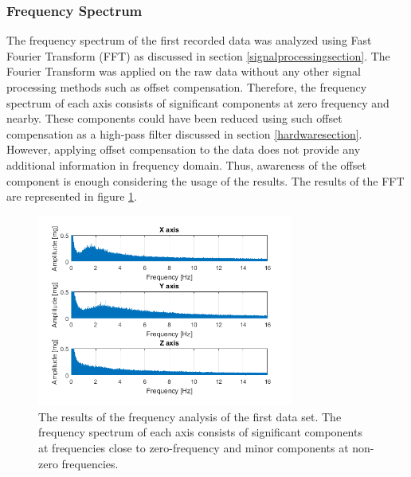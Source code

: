 \documentclass[english,12pt,a4paper,pdftex,elec,utf8]{aaltothesis}
\begin{document}
\subsubsection{Frequency Spectrum}

The frequency spectrum of the first recorded data was analyzed using Fast Fourier Transform (FFT) as discussed in section \ref{signalprocessingsection}. The Fourier Transform was applied on the raw data without any other signal processing methods such as offset compensation. Therefore, the frequency spectrum of each axis consists of significant components at zero frequency and nearby. These components could have been reduced using such offset compensation as a high-pass filter discussed in section \ref{hardwaresection}. However, applying offset compensation to the data does not provide any additional information in frequency domain. Thus, awareness of the offset component is enough considering the usage of the results. The results of the FFT are represented in figure \ref{frequenyspectrumfigure}.

\begin{figure}[htb]
\centering
\includegraphics[width = 0.75\textwidth]{figures/frequencyanalysis2.png}
\caption{The results of the frequency analysis of the first data set. The frequency spectrum of each axis consists of significant components at frequencies close to zero-frequency and minor components at non-zero frequencies.} \label{frequenyspectrumfigure}
\end{figure}
\end{document}
